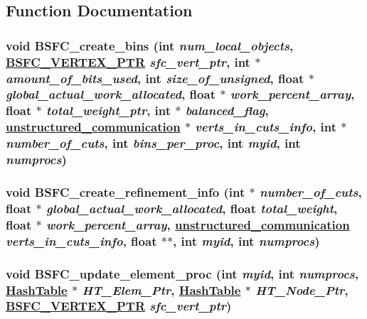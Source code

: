 \subsection{Function Documentation}
\hypertarget{repartition__BSFC_8C_a13}{
\subsubsection[BSFC\_\-create\_\-bins]{\setlength{\rightskip}{0pt plus 5cm}void BSFC\_\-create\_\-bins (int {\em num\_\-local\_\-objects}, \hyperlink{structsfc__vertex}{BSFC\_\-VERTEX\_\-PTR} {\em sfc\_\-vert\_\-ptr}, int $\ast$ {\em amount\_\-of\_\-bits\_\-used}, int {\em size\_\-of\_\-unsigned}, float $\ast$ {\em global\_\-actual\_\-work\_\-allocated}, float $\ast$ {\em work\_\-percent\_\-array}, float $\ast$ {\em total\_\-weight\_\-ptr}, int $\ast$ {\em balanced\_\-flag}, \hyperlink{structunstructured__communication}{unstructured\_\-communication} $\ast$ {\em verts\_\-in\_\-cuts\_\-info}, int $\ast$ {\em number\_\-of\_\-cuts}, int {\em bins\_\-per\_\-proc}, int {\em myid}, int {\em numprocs})}}
\label{repartition__BSFC_8C_a13}


\hypertarget{repartition__BSFC_8C_a12}{
\subsubsection[BSFC\_\-create\_\-refinement\_\-info]{\setlength{\rightskip}{0pt plus 5cm}void BSFC\_\-create\_\-refinement\_\-info (int $\ast$ {\em number\_\-of\_\-cuts}, float $\ast$ {\em global\_\-actual\_\-work\_\-allocated}, float {\em total\_\-weight}, float $\ast$ {\em work\_\-percent\_\-array}, \hyperlink{structunstructured__communication}{unstructured\_\-communication} {\em verts\_\-in\_\-cuts\_\-info}, float $\ast$$\ast$, int {\em myid}, int {\em numprocs})}}
\label{repartition__BSFC_8C_a12}


\hypertarget{repartition__BSFC_8C_a14}{
\subsubsection[BSFC\_\-update\_\-element\_\-proc]{\setlength{\rightskip}{0pt plus 5cm}void BSFC\_\-update\_\-element\_\-proc (int {\em myid}, int {\em numprocs}, \hyperlink{classHashTable}{Hash\-Table} $\ast$ {\em HT\_\-Elem\_\-Ptr}, \hyperlink{classHashTable}{Hash\-Table} $\ast$ {\em HT\_\-Node\_\-Ptr}, \hyperlink{structsfc__vertex}{BSFC\_\-VERTEX\_\-PTR} {\em sfc\_\-vert\_\-ptr})}}
\label{repartition__BSFC_8C_a14}


